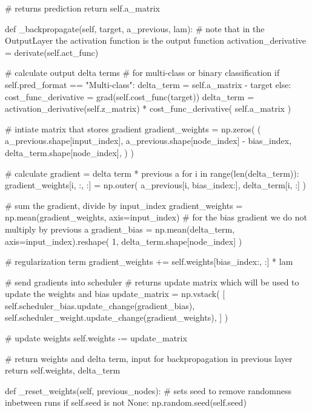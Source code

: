 \documentclass[%
oneside,                 %
final,                   %
10pt]{article}
\begin{document}
        # returns prediction
        return self.a_matrix

    def _backpropagate(self, target, a_previous, lam):
        # note that in the OutputLayer the activation function is the output function
        activation_derivative = derivate(self.act_func)

        # calculate output delta terms
        # for multi-class or binary classification
        if self.pred_format == "Multi-class":
            delta_term = self.a_matrix - target
        else:
            cost_func_derivative = grad(self.cost_func(target))
            delta_term = activation_derivative(self.z_matrix) * cost_func_derivative(
                self.a_matrix
            )

        # intiate matrix that stores gradient
        gradient_weights = np.zeros(
            (
                a_previous.shape[input_index],
                a_previous.shape[node_index] - bias_index,
                delta_term.shape[node_index],
            )
        )

        # calculate gradient = delta term * previous a
        for i in range(len(delta_term)):
            gradient_weights[i, :, :] = np.outer(
                a_previous[i, bias_index:], delta_term[i, :]
            )

        # sum the gradient, divide by input_index
        gradient_weights = np.mean(gradient_weights, axis=input_index)
        # for the bias gradient we do not multiply by previous a
        gradient_bias = np.mean(delta_term, axis=input_index).reshape(
            1, delta_term.shape[node_index]
        )

        # regularization term
        gradient_weights += self.weights[bias_index:, :] * lam

        # send gradients into scheduler
        # returns update matrix which will be used to update the weights and bias
        update_matrix = np.vstack(
            [
                self.scheduler_bias.update_change(gradient_bias),
                self.scheduler_weight.update_change(gradient_weights),
            ]
        )

        # update weights
        self.weights -= update_matrix

        # return weights and delta term, input for backpropagation in previous layer
        return self.weights, delta_term

    def _reset_weights(self, previous_nodes):
        # sets seed to remove randomness inbetween runs
        if self.seed is not None:
            np.random.seed(self.seed)
\end{document}
